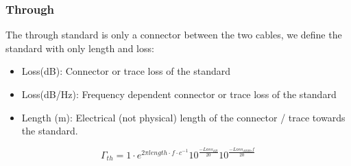 \subsubsection{Through}
\label{sec:throughstd}
The through standard is only a connector between the two cables, we define the standard with only length and loss:
\begin{itemize}
	\item Loss(dB): Connector or trace loss of the standard
	\item Loss(dB/Hz): Frequency dependent connector or trace loss of the standard
	\item Length (m): Electrical (not physical) length of the connector / trace towards the standard.
\end{itemize}
\begin{equation}
\Gamma_{th} = 1 \cdot e^{2 \pi length\cdot f\cdot c^{-1}} 10^{\frac{-Loss_{dB}}{20}} 10^{\frac{-Loss_{dBHz} f }{20}}
\end{equation}

\newpage


